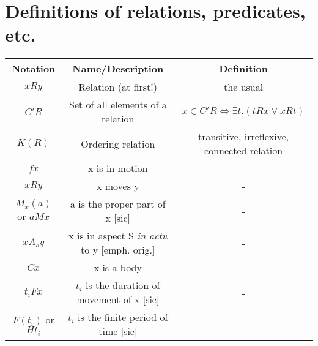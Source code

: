 \documentclass[english,ngerman,paper=a4,]{scrartcl}%
\begin{document}
\section{Definitions of relations, predicates, etc.}
\begin{tabular}{|c|c|c|}
\hline 
\textbf{Notation} & \textbf{Name/Description} & \textbf{Definition} \\ 
\hline 
$x R y$ & Relation (at first!) & the usual \\ 
\hline 
$C'R$& Set of all elements of a relation & $x \in C'R \Leftrightarrow \exists t. (t R x \vee x R t)$ \\ 
\hline 
$K(R)$ & Ordering relation & transitive, irreflexive, connected relation \\ 
\hline 
$f x$ & x is in motion &  - \\ 
\hline 
$x R y$ & x moves y&  - \\ 
\hline 
$M_{x}(a)$ or $a M x$ & a is the proper part of x [sic] & -  \\ 
\hline
$xA_{s}y$ & x is in aspect S \emph{in actu} to y [emph. orig.] & -  \\ 
\hline 
$C x$ & x is a body & -  \\ 
\hline 
 $t_{i}Fx$  & $t_i$ is the duration of movement of x [sic] & -  \\ 
\hline 
 $F(t_i)$ or $Ht_i$ & $t_i$ is the finite period of time [sic]& -  \\ 
\hline 
\end{tabular}
%


\end{document}
